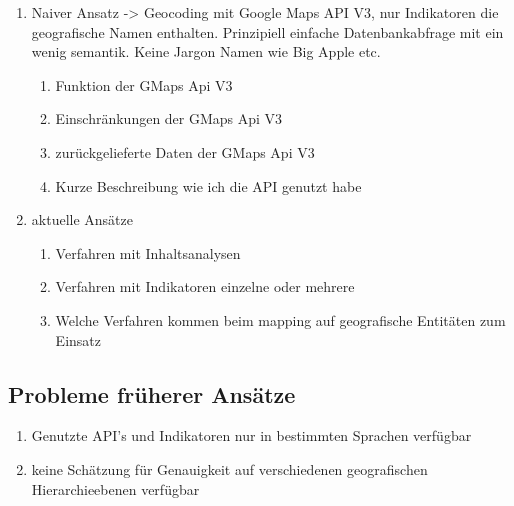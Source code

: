 		\begin{enumerate}
			\item Naiver Ansatz -> Geocoding mit Google Maps API V3, nur Indikatoren die geografische Namen enthalten. 
					Prinzipiell einfache Datenbankabfrage mit ein wenig semantik. 
					Keine Jargon Namen wie Big Apple etc.
				\begin{enumerate}
					\item Funktion der GMaps Api V3
					\item Einschränkungen der GMaps Api V3
					\item zurückgelieferte Daten der GMaps Api V3
					\item Kurze Beschreibung wie ich die API genutzt habe
				\end{enumerate}
			\item aktuelle Ansätze
				\begin{enumerate}
					\item Verfahren mit Inhaltsanalysen
					\item Verfahren mit Indikatoren einzelne oder mehrere
					\item Welche Verfahren kommen beim mapping auf  geografische Entitäten zum Einsatz
				\end{enumerate}
		\end{enumerate}

		\subsection{Probleme früherer Ansätze}
			\begin{enumerate}
				\item{Genutzte API's und Indikatoren nur in bestimmten Sprachen verfügbar}
				\item{keine Schätzung für Genauigkeit auf verschiedenen geografischen Hierarchieebenen verfügbar}  
			\end{enumerate}

	
	
	

	
